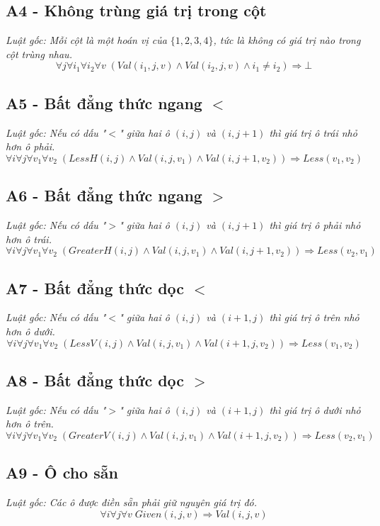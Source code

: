 \subsection*{A4 - Không trùng giá trị trong cột}
\textit{Luật gốc: Mỗi cột là một hoán vị của $\{1, 2, 3, 4\}$, tức là không có giá trị nào trong cột trùng nhau.}
\[
\forall j \forall i_1 \forall i_2 \forall v \;
(Val(i_1,j,v) \land Val(i_2,j,v) \land i_1 \neq i_2) \Rightarrow \bot
\]

\subsection*{A5 - Bất đẳng thức ngang $<$}
\textit{Luật  gốc: Nếu có dấu "$<$" giữa hai ô $(i, j)$ và $(i, j+1)$ thì giá trị ô trái nhỏ hơn ô phải. }
\[
\forall i \forall j \forall v_1 \forall v_2 \;
(LessH(i,j) \land Val(i,j,v_1) \land Val(i,j+1,v_2))
\Rightarrow Less(v_1,v_2)
\]

\subsection*{A6 - Bất đẳng thức ngang $>$}
\textit{Luật  gốc: Nếu có dấu "$>$" giữa hai ô $(i, j)$ và $(i, j+1)$ thì giá trị ô phải nhỏ hơn ô trái. }
\[
\forall i \forall j \forall v_1 \forall v_2 \;
(GreaterH(i,j) \land Val(i,j,v_1) \land Val(i,j+1,v_2))
\Rightarrow Less(v_2,v_1)
\]

\subsection*{A7 - Bất đẳng thức dọc $<$}
\textit{Luật  gốc: Nếu có dấu "$<$" giữa hai ô $(i, j)$ và $(i+1, j)$ thì giá trị ô trên nhỏ hơn ô dưới. }
\[
\forall i \forall j \forall v_1 \forall v_2 \;
(LessV(i,j) \land Val(i,j,v_1) \land Val(i+1,j,v_2))
\Rightarrow Less(v_1,v_2)
\]

\subsection*{A8 - Bất đẳng thức dọc $>$}
\textit{Luật  gốc: Nếu có dấu "$>$" giữa hai ô $(i, j)$ và $(i+1, j)$ thì giá trị ô dưới nhỏ hơn ô trên. }
\[
\forall i \forall j \forall v_1 \forall v_2 \;
(GreaterV(i,j) \land Val(i,j,v_1) \land Val(i+1,j,v_2))
\Rightarrow Less(v_2,v_1)
\]

\subsection*{A9 - Ô cho sẵn}
\textit{Luật  gốc: Các ô được điền sẵn phải giữ nguyên giá trị đó.}
\[
\forall i \forall j \forall v \;
Given(i,j,v) \Rightarrow Val(i,j,v)
\]

